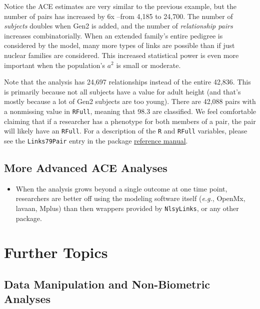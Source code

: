 \documentclass[smallextended]{svjour3}       %
\providecommand{\tightlist}{%
  \setlength{\itemsep}{0pt}\setlength{\parskip}{0pt}}
\begin{document}
Notice the ACE estimates are very similar to the previous example, but
the number of pairs has increased by 6x --from 4,185 to 24,700. The
number of \emph{subjects} doubles when Gen2 is added, and the number of
\emph{relationship pairs} increases combinatorially. When an extended
family's entire pedigree is considered by the model, many more types of
links are possible than if just nuclear families are considered. This
increased statistical power is even more important when the population's
\(a^2\) is small or moderate.

Note that the analysis has 24,697 relationships instead of the entire
42,836. This is primarily because not all subjects have a value for
adult height (and that's mostly because a lot of Gen2 subjects are too
young). There are 42,088 pairs with a nonmissing value in
\texttt{RFull}, meaning that 98.3 are classified. We feel comfortable
claiming that if a researcher has a phenotype for both members of a
pair, the pair will likely have an \texttt{RFull}. For a description of
the \texttt{R} and \texttt{RFull} variables, please see the
\texttt{Links79Pair} entry in the package
\href{https://nlsy-links.github.io/NlsyLinks/}{reference manual}.

\hypertarget{more-advanced-ace-analyses}{%
\subsection{More Advanced ACE
Analyses}\label{more-advanced-ace-analyses}}

\begin{itemize}
\tightlist
\item
  When the analysis grows beyond a single outcome at one time point,
  researchers are better off using the modeling software itself
  (\emph{e.g.}, OpenMx, lavaan, Mplus) than then wrappers provided by
  \texttt{NlsyLinks}, or any other package.
\end{itemize}

\hypertarget{further-topics}{%
\section{Further Topics}\label{further-topics}}

\hypertarget{data-manipulation-and-non-biometric-analyses}{%
\subsection{Data Manipulation and Non-Biometric
Analyses}\label{data-manipulation-and-non-biometric-analyses}}
\end{document}
